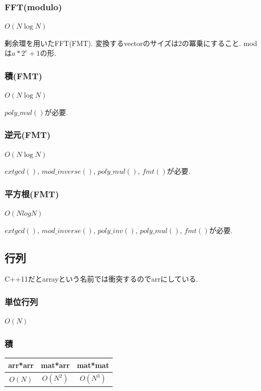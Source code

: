 \documentclass[9pt,twocolumn,a4paper,landscape]{extarticle}
\begin{document}
\subsubsection{FFT(modulo)}
$O(N \log N)$\par
剰余環を用いたFFT(FMT). 変換するvectorのサイズは2の冪乗にすること. modは$a*2^e+1$の形.\\


\subsubsection{積(FMT)}
$O(N \log N)$\par
$poly\_mul()$が必要.


\subsubsection{逆元(FMT)}
$O(N \log N)$\par
$extgcd()$, $mod\_inverse()$, $poly\_mul()$, $fmt()$が必要.


\subsubsection{平方根(FMT)}
$O(N log N)$\par
$extgcd()$, $mod\_inverse()$, $poly\_inv()$, $poly\_mul()$, $fmt()$が必要.



\subsection{行列}
C++11だとarrayという名前では衝突するのでarrにしている.\par


\subsubsection{単位行列}
$O(N)$ \par


\subsubsection{積}
\begin{table}[htb]
  \begin{tabular}{|c|c|c|} \hline
    arr*arr & mat*arr & mat*mat \\ \hline
    $O(N)$ & $O(N^2)$ & $O(N^3)$\\ \hline
  \end{tabular}
\end{table}

\end{document}
